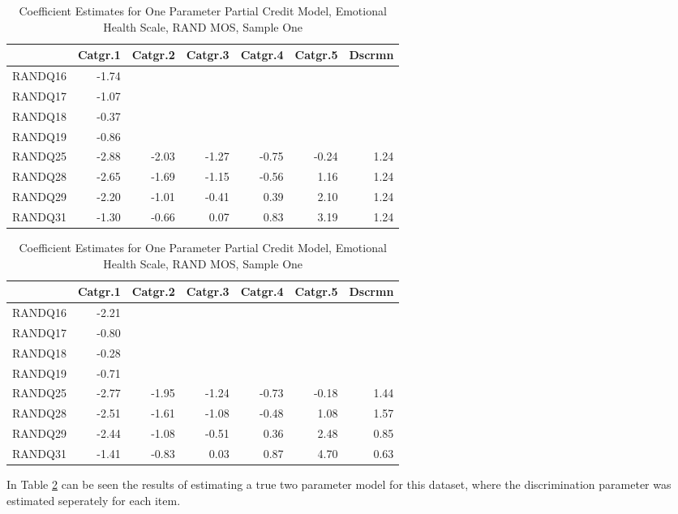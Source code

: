 \documentclass{article}
\begin{document}
\begin{table}[ht]
\centering
\begin{tabular}{rrrrrrr}
  \hline
 & Catgr.1 & Catgr.2 & Catgr.3 & Catgr.4 & Catgr.5 & Dscrmn \\ 
  \hline
RANDQ16 & -1.74 &  &  &  &  &  \\ 
  RANDQ17 & -1.07 &  &  &  &  &  \\ 
  RANDQ18 & -0.37 &  &  &  &  &  \\ 
  RANDQ19 & -0.86 &  &  &  &  &  \\ 
  RANDQ25 & -2.88 & -2.03 & -1.27 & -0.75 & -0.24 & 1.24 \\ 
  RANDQ28 & -2.65 & -1.69 & -1.15 & -0.56 & 1.16 & 1.24 \\ 
  RANDQ29 & -2.20 & -1.01 & -0.41 & 0.39 & 2.10 & 1.24 \\ 
  RANDQ31 & -1.30 & -0.66 & 0.07 & 0.83 & 3.19 & 1.24 \\ 
   \hline
\end{tabular}
\caption{Coefficient Estimates for One Parameter Partial Credit Model, Emotional Health Scale, RAND MOS, Sample One} 
\label{tab:hom1emhealth1pl}
\end{table}
\begin{table}[ht]
\centering
\begin{tabular}{rrrrrrr}
  \hline
 & Catgr.1 & Catgr.2 & Catgr.3 & Catgr.4 & Catgr.5 & Dscrmn \\ 
  \hline
RANDQ16 & -2.21 &  &  &  &  &  \\ 
  RANDQ17 & -0.80 &  &  &  &  &  \\ 
  RANDQ18 & -0.28 &  &  &  &  &  \\ 
  RANDQ19 & -0.71 &  &  &  &  &  \\ 
  RANDQ25 & -2.77 & -1.95 & -1.24 & -0.73 & -0.18 & 1.44 \\ 
  RANDQ28 & -2.51 & -1.61 & -1.08 & -0.48 & 1.08 & 1.57 \\ 
  RANDQ29 & -2.44 & -1.08 & -0.51 & 0.36 & 2.48 & 0.85 \\ 
  RANDQ31 & -1.41 & -0.83 & 0.03 & 0.87 & 4.70 & 0.63 \\ 
   \hline
\end{tabular}
\caption{Coefficient Estimates for One Parameter Partial Credit Model, Emotional Health Scale, RAND MOS, Sample One} 
\label{tab:hom1emhealth2pl}
\end{table}
In Table \ref{tab:hom1emhealth2pl} can be seen the results of estimating a true two parameter model for this dataset, where the discrimination parameter was estimated seperately for each item.
\end{document}
